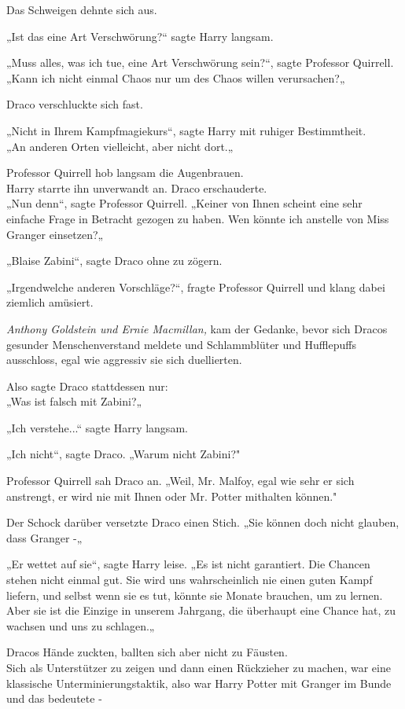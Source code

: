 {Das Schweigen dehnte sich aus.

„Ist das eine Art Verschwörung?“ sagte Harry langsam.

„Muss alles, was ich tue, eine Art Verschwörung sein?“, sagte Professor Quirrell.\\ „Kann ich nicht einmal Chaos nur um des Chaos willen verursachen?„

Draco verschluckte sich fast.

„Nicht in Ihrem Kampfmagiekurs“, sagte Harry mit ruhiger Bestimmtheit.\\ „An anderen Orten vielleicht, aber nicht dort.„

Professor Quirrell hob langsam die Augenbrauen.\\ Harry starrte ihn unverwandt an. Draco erschauderte.\\ „Nun denn“, sagte Professor Quirrell. „Keiner von Ihnen scheint eine sehr einfache Frage in Betracht gezogen zu haben. Wen könnte ich anstelle von Miss Granger einsetzen?„

„Blaise Zabini“, sagte Draco ohne zu zögern.

„Irgendwelche anderen Vorschläge?“, fragte Professor Quirrell und klang dabei ziemlich amüsiert.

\emph{Anthony Goldstein und Ernie Macmillan,} kam der Gedanke, bevor sich Dracos gesunder Menschenverstand meldete und Schlammblüter und Hufflepuffs ausschloss, egal wie aggressiv sie sich duellierten.

Also sagte Draco stattdessen nur:\\ „Was ist falsch mit Zabini?„

„Ich verstehe...“ sagte Harry langsam.

„Ich nicht“, sagte Draco. „Warum nicht Zabini?"

Professor Quirrell sah Draco an. „Weil, Mr. Malfoy, egal wie sehr er sich anstrengt, er wird nie mit Ihnen oder Mr. Potter mithalten können."

Der Schock darüber versetzte Draco einen Stich. „Sie können doch nicht glauben, dass Granger -„

„Er wettet auf sie“, sagte Harry leise. „Es ist nicht garantiert. Die Chancen stehen nicht einmal gut. Sie wird uns wahrscheinlich nie einen guten Kampf liefern, und selbst wenn sie es tut, könnte sie Monate brauchen, um zu lernen.\\ Aber sie ist die Einzige in unserem Jahrgang, die überhaupt eine Chance hat, zu wachsen und uns zu schlagen.„

Dracos Hände zuckten, ballten sich aber nicht zu Fäusten.\\ Sich als Unterstützer zu zeigen und dann einen Rückzieher zu machen, war eine klassische Unterminierungstaktik, also war Harry Potter mit Granger im Bunde und das bedeutete -

}
